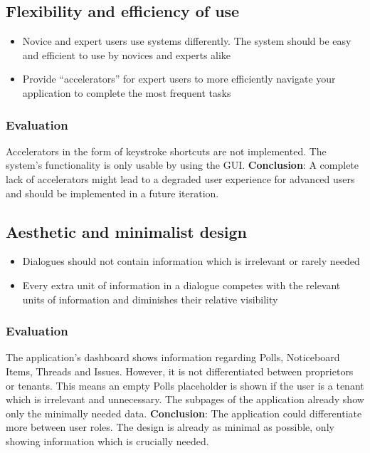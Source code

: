 \subsection{Flexibility and efficiency of use}

\begin{itemize}
    \item Novice and expert users use systems differently. The system should be easy and efficient to use by novices and experts alike
    \item Provide “accelerators” for expert users to more efficiently navigate your application to complete the most frequent tasks
\end{itemize}

\subsubsection{Evaluation}
Accelerators in the form of keystroke shortcuts are not implemented. The system's functionality is only usable by using the GUI. \textbf{Conclusion}: A complete lack of accelerators might lead to a degraded user experience for advanced users and should be implemented in a future iteration.

\subsection{Aesthetic and minimalist design}

\begin{itemize}
    \item Dialogues should not contain information which is irrelevant or rarely needed
    \item Every extra unit of information in a dialogue competes with the relevant units of information and diminishes their relative visibility
\end{itemize}

\subsubsection{Evaluation}
The application's dashboard shows information regarding Polls, Noticeboard Items, Threads and Issues. However, it is not differentiated between proprietors or tenants. This means an empty Polls placeholder is shown if the user is a tenant which is irrelevant and unnecessary. The subpages of the application already show only the minimally needed data. \textbf{Conclusion}: The application could differentiate more between user roles. The design is already as minimal as possible, only showing information which is crucially needed.

